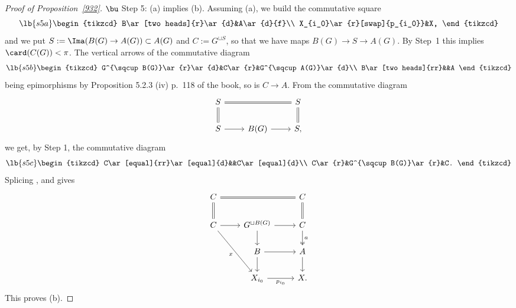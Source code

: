 \documentclass[12pt]{article}
\theoremstyle{remark}
\theoremstyle{definition}
\begin{document}
\begin{proof}[Proof of Proposition~\ref{932}]
\nn$\bu$ Step 5: (a) implies (b). Assuming (a), we build the commutative square 
\begin{equation}\lb{s5a}
\begin{tikzcd}
B\ar[two heads]{r}\ar{d}&A\ar{d}{f}\\ 
X_{i_0}\ar{r}[swap]{p_{i_0}}&X,
\end{tikzcd}
\end{equation} 
and we put $S:=\Ima(B(G)\to A(G))\subset A(G)$ and $C:=G^{\sqcup S}$, so that we have maps $B(G)\to S\to A(G)$. By Step~1 this implies $\card(C(G))<\pi$. The vertical arrows of the commutative diagram 
\begin{equation}\lb{s5b}
\begin{tikzcd}
G^{\sqcup B(G)}\ar{r}\ar{d}&C\ar{r}&G^{\sqcup A(G)}\ar{d}\\ 
B\ar[two heads]{rr}&&A
\end{tikzcd}
\end{equation} 
being epimorphisms by Proposition 5.2.3 (iv) p.~118 of the book, so is $C\to A$. From the commutative diagram 
$$
\begin{tikzcd}
S\ar[equal]{rr}\ar[equal]{d}&&S\ar[equal]{d}\\ 
S\ar{r}&B(G)\ar{r}&S,
\end{tikzcd}
$$ 
we get, by Step 1, the commutative diagram 
\begin{equation}\lb{s5c}
\begin{tikzcd}
C\ar[equal]{rr}\ar[equal]{d}&&C\ar[equal]{d}\\ 
C\ar{r}&G^{\sqcup B(G)}\ar{r}&C.
\end{tikzcd}
\end{equation} 
Splicing ,  and  gives 
$$
\begin{tikzcd}
C\ar[equal]{rr}\ar[equal]{d}&&C\ar[equal]{d}\\ 
C\ar{r}\ar{rdd}[swap]{x}&G^{\sqcup B(G)}\ar{r}\ar{d}&C\ar[two heads]{d}{a}\\ 
{}&B\ar{r}\ar{d}&A\ar{d}\\ 
{}&X_{i_0}\ar{r}[swap]{p_{i_0}}&X.
\end{tikzcd}
$$ 
This proves (b).


\end{proof}
\end{document}

